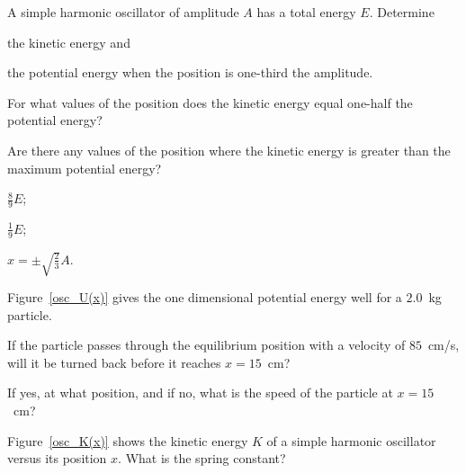 \begin{problem}
	A simple harmonic oscillator of amplitude $A$ has a total energy $E$. 
	Determine 
	\begin{enumerate*}[label=(\alph*)]
		\item the kinetic energy and
		\item the potential energy when the position is one-third the amplitude.
		\item For what values of the position does the kinetic energy equal one-half the potential energy?
		\item Are there any values of the position where the kinetic energy is greater than the maximum potential energy?
	\end{enumerate*}
	\begin{solution}
		\begin{enumerate*}[label=(\alph*)]
			\item $\frac{8}{9} E$;
			\item $\frac{1}{9} E$;
			\item $x = \pm \sqrt{\frac23} A$.
		\end{enumerate*}
	\end{solution}
\end{problem}


\begin{problem}\label{prb:osc_U(x)}
	Figure~\ref{osc_U(x)} gives the one dimensional potential energy well for a $2.0$~kg particle. 
	\begin{enumerate*}[label=(\alph*)]
		\item If the particle passes through the equilibrium position with a velocity of $85$~cm/s, will it be turned back before it reaches $x = 15$~cm?
		\item If yes, at what position, and if no, what is the speed of the particle at $x = 15$~cm?
	\end{enumerate*}
\end{problem}


\begin{problem}\label{prb:osc_K(x)}
	Figure~\ref{osc_K(x)} shows the kinetic energy $K$ of a simple harmonic oscillator versus its position $x$. What is the spring constant?
\end{problem}

